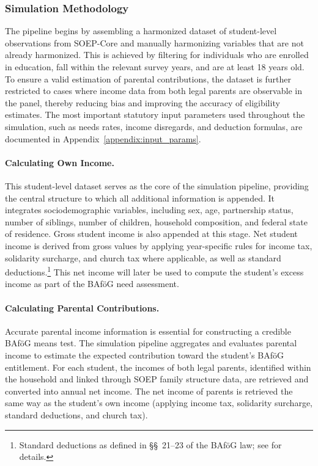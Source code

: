 
\subsubsection{Simulation Methodology}
The pipeline begins by assembling a harmonized dataset of student-level observations from SOEP-Core and manually harmonizing variables that are not already harmonized. 
This is achieved by filtering for individuals who are enrolled in education, fall within the relevant survey years, and are at least 18 years old. 
To ensure a valid estimation of parental contributions, the dataset is further restricted to cases where income data from both legal parents are observable in the panel, thereby reducing bias and improving the accuracy of eligibility estimates. 
The most important statutory input parameters used throughout the simulation, such as needs rates, income disregards, and deduction formulas, are documented in Appendix~\ref{appendix:input_params}.

\paragraph{Calculating Own Income.} 
This student-level dataset serves as the core of the simulation pipeline, providing the central structure to which all additional information is appended. 
It integrates sociodemographic variables, including sex, age, partnership status, number of siblings, number of children, household composition, and federal state of residence. 
Gross student income is also appended at this stage. 
Net student income is derived from gross values by applying year-specific rules for income tax, solidarity surcharge, and church tax where applicable, as well as standard deductions.\footnote{
Standard deductions as defined in §§~21–23 of the BAföG law; see \citet{bafoeg_law} for details.
} 
This net income will later be used to compute the student’s excess income as part of the BAföG need assessment.

\paragraph{Calculating Parental Contributions.}
Accurate parental income information is essential for constructing a credible BAföG means test. 
The simulation pipeline aggregates and evaluates parental income to estimate the expected contribution toward the student’s BAföG entitlement. 
For each student, the incomes of both legal parents, identified within the household and linked through SOEP family structure data, are retrieved and converted into annual net income. 
The net income of parents is retrieved the same way as the student's own income (applying income tax, solidarity surcharge, standard deductions, and church tax).

